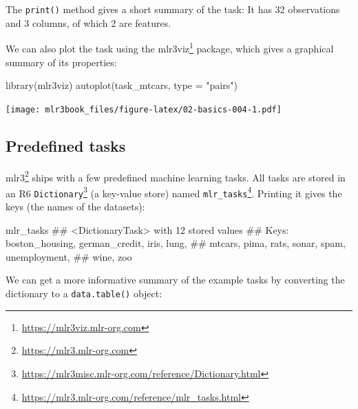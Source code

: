 \documentclass[12pt,]{scrbook}
\newenvironment{Shaded}{}{}
\newcommand{\DataTypeTok}[1]{#1}
\newcommand{\KeywordTok}[1]{\textcolor[rgb]{0.00,0.00,1.00}{#1}}
\newcommand{\NormalTok}[1]{#1}
\newcommand{\StringTok}[1]{\textcolor[rgb]{0.00,0.50,0.50}{#1}}
\renewcommand{\href}[2]{#2\footnote{\url{#1}}}
\begin{document}
The \texttt{print()} method gives a short summary of the task:
It has 32 observations and 3 columns, of which 2 are features.

We can also plot the task using the \href{https://mlr3viz.mlr-org.com}{mlr3viz} package, which gives a graphical summary of its properties:

\begin{Shaded}
\begin{Highlighting}[]
\KeywordTok{library}\NormalTok{(mlr3viz)}
\KeywordTok{autoplot}\NormalTok{(task_mtcars, }\DataTypeTok{type =} \StringTok{"pairs"}\NormalTok{)}
\end{Highlighting}
\end{Shaded}

\texttt{[image: mlr3book\_files/figure-latex/02-basics-004-1.pdf]}

\hypertarget{tasks-predefined}{%
\subsection{Predefined tasks}\label{tasks-predefined}}

\href{https://mlr3.mlr-org.com}{mlr3} ships with a few predefined machine learning tasks.
All tasks are stored in an R6 \href{https://mlr3misc.mlr-org.com/reference/Dictionary.html}{\texttt{Dictionary}} (a key-value store) named \href{https://mlr3.mlr-org.com/reference/mlr_tasks.html}{\texttt{mlr\_tasks}}.
Printing it gives the keys (the names of the datasets):

\begin{Shaded}
\begin{Highlighting}[]
\NormalTok{mlr_tasks}
\NormalTok{## <DictionaryTask> with 12 stored values}
\NormalTok{## Keys: boston_housing, german_credit, iris, lung,}
\NormalTok{##   mtcars, pima, rats, sonar, spam, unemployment,}
\NormalTok{##   wine, zoo}
\end{Highlighting}
\end{Shaded}

We can get a more informative summary of the example tasks by converting the dictionary to a \texttt{data.table()} object:
\end{document}
